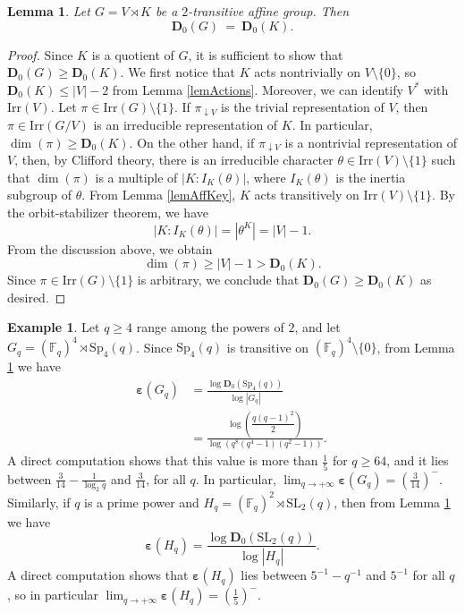 \documentclass{daj}
\newtheorem{lemma}[theorem]{Lemma}
\theoremstyle{definition}
\newtheorem{example}[theorem]{Example}
\theoremstyle{remark}
\newcommand{\Irr}{\mathrm{Irr}}
\newcommand{\Sp}{\mathrm{Sp}}
\newcommand{\SL}{\mathrm{SL}}
\newcommand{\D}{\mathbf{D}}
\renewcommand{\a}{\boldsymbol{\varepsilon}}
\begin{document}
\begin{lemma} \label{lemAffSp} 
	Let $G = V \rtimes K$ be a $2$-transitive affine group.
	Then
	$$ \D_0(G) \> = \> \D_0(K) . $$
\end{lemma}
\begin{proof}
	Since $K$ is a quotient of $G$,
	it is sufficient to show that $\D_0(G) \geq \D_0(K)$.
	We first notice that $K$ acts nontrivially on $V \setminus \{0\}$,
	so $\D_0(K) \leq |V|-2$ from Lemma \ref{lemActions}.
	Moreover, we can identify $V^*$ with $\Irr(V)$.
	Let $\pi \in \Irr(G) \setminus \{1\}$.
	If $\pi_{\downarrow V}$ is the trivial representation of $V$, then $\pi \in \Irr(G/V)$ is an irreducible representation of $K$.
	In particular, $\dim(\pi) \geq \D_0(K)$.
	On the other hand, if $\pi_{\downarrow V}$ is a nontrivial representation of $V$,
	then, by Clifford theory, there is an irreducible character $\theta \in \Irr(V) \setminus \{1\}$ such that
	$\dim(\pi)$ is a multiple of $|K:I_K(\theta)|$, where $I_K(\theta)$ is the inertia subgroup of $\theta$. 
	From Lemma \ref{lemAffKey}, $K$ acts transitively on $\Irr(V) \setminus \{1\}$.
	By the orbit-stabilizer theorem, we have
	$$ |K:I_K(\theta)| = |\theta^K| = |V|-1 . $$
	From the discussion above, we obtain
	$$ \dim(\pi) \geq |V|-1 > \D_0(K) . $$
	Since $\pi \in \Irr(G) \setminus \{1\}$ is arbitrary, we conclude that $\D_0(G) \geq \D_0(K)$ as desired.
\end{proof}

\begin{example} \label{ex:ASp} 
	Let $q \geq 4$ range among the powers of $2$, and let $G_q = (\mathbb{F}_q)^4 \rtimes \Sp_4(q)$. 
	Since $\Sp_4(q)$ is transitive on $(\mathbb{F}_q)^4 \setminus \{0\}$, from Lemma \ref{lemAffSp} we have
	\[\begin{split}
		\a(G_q) &= \frac{\log \D_0 ( \Sp_4(q) )}{\log |G_q|}
		\\&= \frac{\log \left( \dfrac{q(q-1)^2}{2} \right) }{\log (q^8(q^4-1)(q^2-1))} .
	\end{split} \, \]
	A direct computation shows that this value is more than $\frac{1}{5}$ for $q \geq 64$,
	and it lies between $\frac{3}{14} - \frac{1}{\log_2 q}$ and $\frac{3}{14}$,
	for all $q$. In particular, $\lim_{q \rightarrow +\infty} \a(G_q) = \left( \frac{3}{14} \right)^-$.
	Similarly, if $q$ is a prime power and $H_q = (\mathbb{F}_q)^2 \rtimes \SL_2(q)$,
	then from Lemma \ref{lemAffSp} we have
	$$ \a(H_q) = \frac{\log \D_0(\SL_2(q))}{\log|H_q|} . $$
	A direct computation shows that $\a(H_q)$ lies between $5^{-1} -q^{-1}$ and $5^{-1}$ for all $q$,
	so in particular $\lim_{q \rightarrow +\infty} \a(H_q) = \left( \frac{1}{5} \right)^-$.
\end{example}
\end{document}
